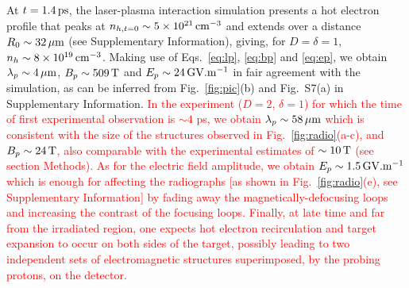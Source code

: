 \documentclass[aps,twocolumn,showpacs,superscriptaddress]{revtex4}
\begin{document}
At  $t = 1.4\,\rm ps$, the laser-plasma interaction simulation presents a hot electron profile that peaks at $n_{h, t=0} \sim 5\times 10^{21}\,\rm cm^{-3}$ and extends over a distance $R_0\sim 32\,\rm \mu m$ (see Supplementary Information), giving, for $D=\delta=1$, $n_h \sim 8 \times 10^{19}\,\rm cm^{-3}$.
Making use of Eqs.~\eqref{eq:lp}, \eqref{eq:bp} and \eqref{eq:ep}, we obtain $\lambda_p \sim 4 \,\rm \mu m$, $B_p \sim 509\,\rm T$ and $E_p\sim 24\,\rm GV.m^{-1}$ in fair agreement with the simulation, as can be inferred from Fig.~\ref{fig:pic}(b) and Fig.~S7(a) in Supplementary Information. 
\textcolor{red}{
In the experiment ($D=2$, $\delta=1$) for which the time of first experimental observation is $\sim 4$ ps, we obtain
$\lambda_p \sim 58 \,\rm \mu m$ which is consistent with the size of the structures observed in Fig.~\ref{fig:radio}(a-c), and   $B_p\sim 24\,\rm T$, also comparable with the experimental estimates of $\sim 10\,\rm T$ (see section Methods). As for the electric field amplitude, we obtain $E_p \sim 1.5\,\rm GV.m^{-1}$ which is enough for affecting  the radiographs [as shown in Fig.~\ref{fig:radio}(e), see Supplementary Information] by fading away the magnetically-defocusing loops and increasing the contrast of the focusing loops.
Finally, at late time and far from the irradiated region, one expects hot electron recirculation and target expansion to occur on both sides of the target, possibly leading to two independent sets of electromagnetic structures superimposed, by the probing protons, on the detector.}
\end{document}
